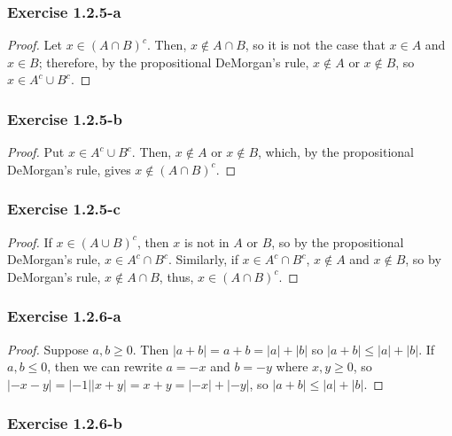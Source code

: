 \documentclass{article}
\begin{document}
\subsubsection*{Exercise 1.2.5-a}

\begin{proof}
Let $x \in (A \cap B)^c$. Then, $x \not\in A \cap B$, so it is not the case that $x \in A$ and $x \in B$; therefore, by the propositional DeMorgan's rule,
$x \not\in A$ or $x \not\in B$, so $x \in A^c \cup B^c$.
\end{proof}

\subsubsection*{Exercise 1.2.5-b}

\begin{proof}
Put $x \in A^c \cup B^c$. Then, $x \not\in A$ or $x \not\in B$, which, by the propositional DeMorgan's rule, gives $x \not\in (A \cap B)^c$.
\end{proof}

\subsubsection*{Exercise 1.2.5-c}

\begin{proof}
If $x \in (A \cup B)^c$, then $x$ is not in $A$ or $B$, so by the propositional DeMorgan's rule, $x \in A^c \cap B^c$.
Similarly, if $x \in A^c \cap B^c$, $x \not\in A$ and $x \not\in B$, so by DeMorgan's rule, $x \not\in A \cap B$, thus, $x \in (A \cap B)^c$.
\end{proof}

\subsubsection*{Exercise 1.2.6-a}

\begin{proof}
Suppose $a, b \geq 0$. Then $|a + b| = a + b = |a| + |b|$ so $|a + b| \leq |a| + |b|$.
If $a, b \leq 0$, then we can rewrite $a = -x$ and $b = -y$ where $x, y \geq 0$, so $|- x - y| = |-1||x + y| = x + y = |-x| + |-y|$,
so $|a + b| \leq |a| + |b|$.
\end{proof}

\subsubsection*{Exercise 1.2.6-b}
\end{document}
